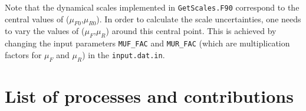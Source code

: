 \documentclass[english,12pt]{article}
\begin{document}
Note that the dynamical scales implemented in {\tt GetScales.F90} correspond to the central values of ($\mu_{F0}$,$\mu_{R0}$). 
In order to calculate the scale uncertainties, one needs to vary the values of ($\mu_{F}$,$\mu_{R}$) around this central point. 
This is achieved by changing the input parameters {\tt MUF\_FAC} and {\tt MUR\_FAC} (which are multiplication factors for 
$\mu_F$ and $\mu_R$) in the {\tt input.dat.in}. 
\newpage
\appendix
\section{List of processes and contributions}
\label{sec:list_proc_cont}
\end{document}

